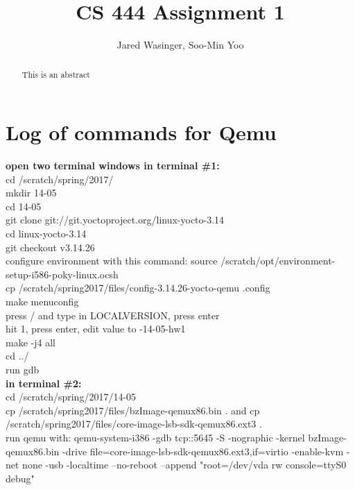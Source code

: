\documentclass[letterpaper,10pt]{article}
\title{CS 444 Assignment 1}
\author{Jared Wasinger, Soo-Min Yoo}
\begin{document}
\maketitle

\begin{abstract}
	This is an abstract
\end{abstract}
\newpage

\tableofcontents

\newpage



\section{Log of commands for Qemu}


\textbf{open two terminal windows in terminal \#1:}\\
  cd /scratch/spring/2017/\\
  mkdir 14-05\\
  cd 14-05\\
  git clone git://git.yoctoproject.org/linux-yocto-3.14\\
  cd linux-yocto-3.14\\
  git checkout v3.14.26\\
  configure environment with this command: source /scratch/opt/environment-setup-i586-poky-linux.ocsh\\
  cp /scratch/spring2017/files/config-3.14.26-yocto-qemu .config\\
  make menuconfig\\
  press / and type in LOCALVERSION, press enter\\
  hit 1, press enter, edit value to -14-05-hw1\\
  make -j4 all\\
  cd ../\\
  run gdb\\

\textbf{in terminal \#2:}\\
  cd /scratch/spring/2017/14-05\\
  cp /scratch/spring2017/files/bzImage-qemux86.bin . and cp /scratch/spring2017/files/core-image-lsb-sdk-qemux86.ext3 .\\
  run qemu with: qemu-system-i386 -gdb tcp::5645 -S -nographic -kernel bzImage-qemux86.bin -drive file=core-image-lsb-sdk-qemux86.ext3,if=virtio -enable-kvm -net none -usb -localtime --no-reboot --append "root=/dev/vda rw console=ttyS0 debug"\\
\end{document}
